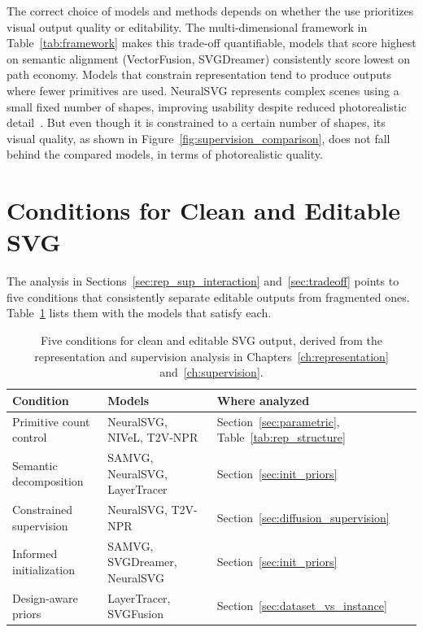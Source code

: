 The correct choice of models and methods depends 
on whether the use prioritizes visual output quality 
or editability. The multi-dimensional framework in 
Table~\ref{tab:framework} makes this trade-off 
quantifiable, models that score highest on semantic 
alignment (VectorFusion, SVGDreamer) consistently 
score lowest on path economy.
Models that constrain representation tend to produce outputs where fewer primitives are used. 
NeuralSVG represents complex scenes using a small 
fixed number of shapes, improving usability despite reduced 
photorealistic detail~\cite{polaczekNeuralSVGImplicitRepresentation2025}. 
But even though it is constrained to a certain number of shapes, 
its visual quality, as shown in Figure~\ref{fig:supervision_comparison}, 
does not fall behind the compared models, in terms of photorealistic quality.


\section{Conditions for Clean and Editable SVG}
\label{sec:conditions}

The analysis in Sections~\ref{sec:rep_sup_interaction} 
and~\ref{sec:tradeoff} points to five conditions that 
consistently separate editable outputs from fragmented 
ones. Table~\ref{tab:conditions} lists them with the 
models that satisfy each.

\begin{table}[htbp]
\centering
\caption{Five conditions for clean and editable SVG 
output, derived from the representation and supervision 
analysis in Chapters~\ref{ch:representation} 
and~\ref{ch:supervision}.}
\label{tab:conditions}
\begin{tabular}{p{4cm} p{4.5cm} p{4.5cm}}
\hline
\textbf{Condition} & \textbf{Models} & \textbf{Where analyzed} \\
\hline
Primitive count control & NeuralSVG, NIVeL, T2V-NPR & Section~\ref{sec:parametric}, Table~\ref{tab:rep_structure} \\
Semantic decomposition & SAMVG, NeuralSVG, LayerTracer & Section~\ref{sec:init_priors} \\
Constrained supervision & NeuralSVG, T2V-NPR & Section~\ref{sec:diffusion_supervision} \\
Informed initialization & SAMVG, SVGDreamer, NeuralSVG & Section~\ref{sec:init_priors} \\
Design-aware priors & LayerTracer, SVGFusion & Section~\ref{sec:dataset_vs_instance} \\
\hline
\end{tabular}
\end{table}

